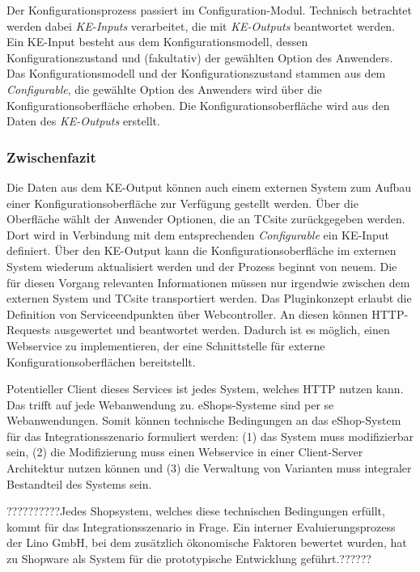 \documentclass[12pt,a4paper,bibliography=totocnumbered,listof=totoc]{scrartcl}
\begin{document}
Der Konfigurationsprozess passiert im Configuration-Modul. Technisch betrachtet werden dabei \emph{KE-Inputs} verarbeitet, die mit \emph{KE-Outputs} beantwortet werden. Ein KE-Input besteht aus dem Konfigurationsmodell, dessen Konfigurationszustand und (fakultativ) der gewählten Option des Anwenders. Das Konfigurationsmodell und der Konfigurationszustand stammen aus dem \emph{Configurable}, die gewählte Option des Anwenders wird über die Konfigurationsoberfläche erhoben. Die Konfigurationsoberfläche wird aus den Daten des \emph{KE-Outputs} erstellt.

\subsubsection{Zwischenfazit}
\label{subsubsection:tcsiteFazit}

Die Daten aus dem KE-Output können auch einem externen System zum Aufbau einer Konfigurationsoberfläche zur Verfügung gestellt werden. Über die Oberfläche wählt der Anwender Optionen, die an TCsite zurückgegeben werden. Dort wird in Verbindung mit dem entsprechenden \emph{Configurable} ein KE-Input definiert. Über den KE-Output kann die Konfigurationsoberfläche im externen System wiederum aktualisiert werden und der Prozess beginnt von neuem. Die für diesen Vorgang relevanten Informationen müssen nur irgendwie zwischen dem externen System und TCsite transportiert werden. Das Pluginkonzept erlaubt die Definition von Serviceendpunkten über Webcontroller. An diesen können HTTP-Requests ausgewertet und beantwortet werden. Dadurch ist es möglich, einen Webservice zu implementieren, der eine Schnittstelle für externe Konfigurationsoberflächen bereitstellt.

Potentieller Client dieses Services ist jedes System, welches HTTP nutzen kann. Das trifft auf jede Webanwendung zu. eShops-Systeme sind per se Webanwendungen. Somit können technische Bedingungen an das eShop-System für das Integrationsszenario formuliert werden: (1) das System muss modifizierbar sein, (2) die Modifizierung muss einen Webservice in einer Client-Server Architektur nutzen können und (3) die Verwaltung von Varianten muss integraler Bestandteil des Systems sein.

??????????Jedes Shopsystem, welches diese technischen Bedingungen erfüllt, kommt für das Integrationsszenario in Frage. Ein interner Evaluierungsprozess der Lino GmbH, bei dem zusätzlich ökonomische Faktoren bewertet wurden, hat zu Shopware als System für die prototypische Entwicklung geführt.??????
\end{document}
